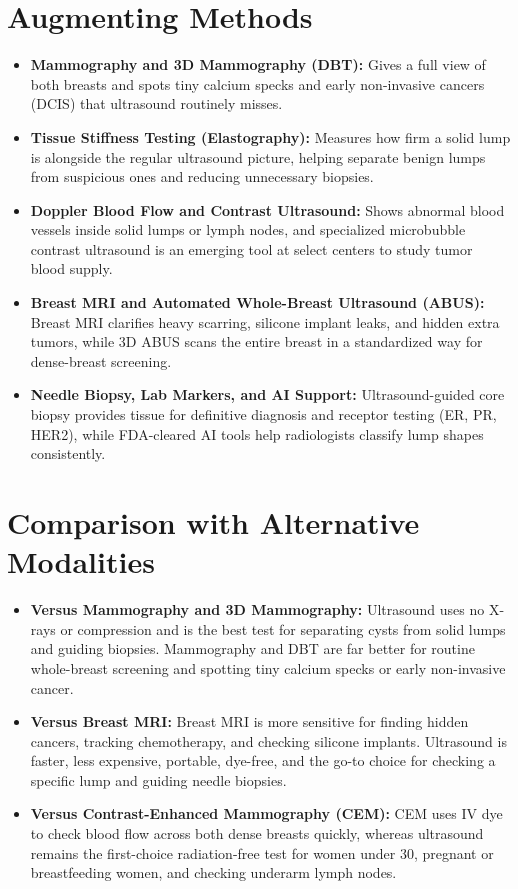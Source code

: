 \section{Augmenting Methods}
\begin{itemize}
\item \textbf{Mammography and 3D Mammography (DBT):} Gives a full view of both breasts and spots tiny calcium specks and early non-invasive cancers (DCIS) that ultrasound routinely misses.
\item \textbf{Tissue Stiffness Testing (Elastography):} Measures how firm a solid lump is alongside the regular ultrasound picture, helping separate benign lumps from suspicious ones and reducing unnecessary biopsies.
\item \textbf{Doppler Blood Flow and Contrast Ultrasound:} Shows abnormal blood vessels inside solid lumps or lymph nodes, and specialized microbubble contrast ultrasound is an emerging tool at select centers to study tumor blood supply.
\item \textbf{Breast MRI and Automated Whole-Breast Ultrasound (ABUS):} Breast MRI clarifies heavy scarring, silicone implant leaks, and hidden extra tumors, while 3D ABUS scans the entire breast in a standardized way for dense-breast screening.
\item \textbf{Needle Biopsy, Lab Markers, and AI Support:} Ultrasound-guided core biopsy provides tissue for definitive diagnosis and receptor testing (ER, PR, HER2), while FDA-cleared AI tools help radiologists classify lump shapes consistently.
\end{itemize}

\section{Comparison with Alternative Modalities}
\begin{itemize}
\item \textbf{Versus Mammography and 3D Mammography:} Ultrasound uses no X-rays or compression and is the best test for separating cysts from solid lumps and guiding biopsies. Mammography and DBT are far better for routine whole-breast screening and spotting tiny calcium specks or early non-invasive cancer.
\item \textbf{Versus Breast MRI:} Breast MRI is more sensitive for finding hidden cancers, tracking chemotherapy, and checking silicone implants. Ultrasound is faster, less expensive, portable, dye-free, and the go-to choice for checking a specific lump and guiding needle biopsies.
\item \textbf{Versus Contrast-Enhanced Mammography (CEM):} CEM uses IV dye to check blood flow across both dense breasts quickly, whereas ultrasound remains the first-choice radiation-free test for women under 30, pregnant or breastfeeding women, and checking underarm lymph nodes.
\end{itemize}

